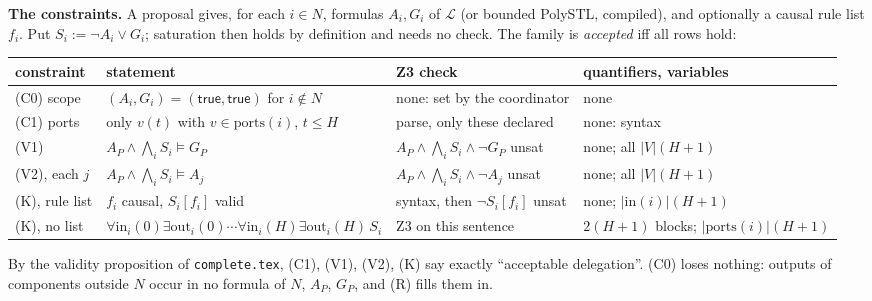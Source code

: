 \documentclass[10pt]{article}
\theoremstyle{tplain}\newtheorem{theorem}{Theorem}\newtheorem{lemma}[theorem]{Lemma}\newtheorem{proposition}[theorem]{Proposition}\newtheorem{corollary}[theorem]{Corollary}\newtheorem{claim}[theorem]{Claim}
\theoremstyle{tdef}\newtheorem{definition}[theorem]{Definition}
\newcommand{\inp}{\mathrm{in}}\newcommand{\outp}{\mathrm{out}}\newcommand{\ports}{\mathrm{ports}}
\newcommand{\TRUE}{\mathsf{true}}\newcommand{\FALSE}{\mathsf{false}}
\begin{document}
\textbf{The constraints.} A proposal gives, for each $i\in N$, formulas $A_i,G_i$ of $\mathcal L$ (or bounded PolySTL, compiled), and optionally a causal rule list $f_i$. Put $S_i:=\neg A_i\vee G_i$; saturation then holds by definition and needs no check. The family is \emph{accepted} iff all rows hold:\par\vspace{2pt}
{\renewcommand{\arraystretch}{1.12}
\begin{tabular}{@{}lll>{\raggedright\arraybackslash}p{1.55in}@{}}
constraint & statement & Z3 check & quantifiers, variables\\\hline
(C0) scope & $(A_i,G_i)=(\TRUE,\TRUE)$ for $i\notin N$ & none: set by the coordinator & none\\
(C1) ports & only $v(t)$ with $v\in\ports(i)$, $t\le H$ & parse, only these declared & none: syntax\\
(V1) & $A_P\wedge\bigwedge_iS_i\models G_P$ & $A_P\wedge\bigwedge_iS_i\wedge\neg G_P$ unsat & none; all $|V|(H+1)$\\
(V2), each $j$ & $A_P\wedge\bigwedge_iS_i\models A_j$ & $A_P\wedge\bigwedge_iS_i\wedge\neg A_j$ unsat & none; all $|V|(H+1)$\\
(K), rule list & $f_i$ causal, $S_i[f_i]$ valid & syntax, then $\neg S_i[f_i]$ unsat & none; $|\inp(i)|(H+1)$\\
(K), no list & $\forall\inp_i(0)\exists\outp_i(0)\cdots\forall\inp_i(H)\exists\outp_i(H)\,S_i$ & Z3 on this sentence & $2(H+1)$ blocks; $|\ports(i)|(H+1)$
\end{tabular}}\par\vspace{2pt}
By the validity proposition of \texttt{complete.tex}, (C1), (V1), (V2), (K) say exactly ``acceptable delegation''. (C0) loses nothing: outputs of components outside $N$ occur in no formula of $N$, $A_P$, $G_P$, and (R) fills them in.
\end{document}

